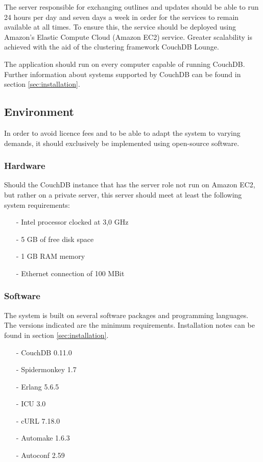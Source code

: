 The server responsible for exchanging outlines and updates should be able to run 24 hours per day and seven days a week in order for the services to remain available at all times. To ensure this, the service should be deployed using Amazon's Elastic Compute Cloud (Amazon EC2) service. Greater scalability is achieved with the aid of the clustering framework CouchDB Lounge.

The application should run on every computer capable of running CouchDB. Further information about systems supported by CouchDB can be found in section \ref{sec:installation}.


\subsection{Environment}

In order to avoid licence fees and to be able to adapt the system to varying demands, it should exclusively be implemented using open-source software.


\subsubsection{Hardware}

Should the CouchDB instance that has the server role not run on Amazon EC2, but rather on a private server, this server should meet at least the following system requirements:

\begin{itemize}  
  \item[-] Intel processor clocked at 3,0 GHz
  \item[-] 5 GB of free disk space
  \item[-] 1 GB RAM memory
  \item[-] Ethernet connection of 100 MBit
\end{itemize}


\subsubsection{Software}

The system is built on several software packages and programming languages. The versions indicated are the minimum requirements. Installation notes can be found in section \ref{sec:installation}.

\begin{itemize}  
  \item[-] CouchDB 0.11.0
  \item[-] Spidermonkey 1.7
  \item[-] Erlang 5.6.5
  \item[-] ICU 3.0
  \item[-] cURL 7.18.0
  \item[-] Automake 1.6.3
  \item[-] Autoconf 2.59
\end{itemize}

